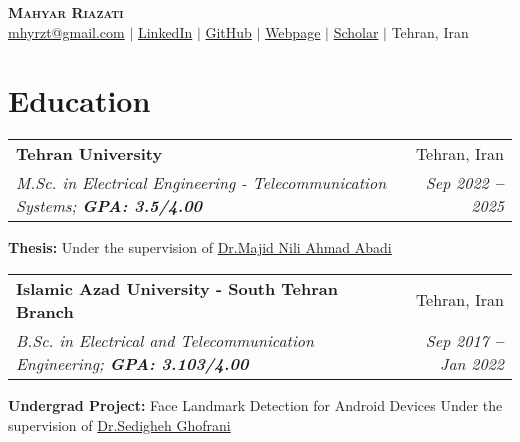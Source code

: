 \documentclass[letterpaper,11pt]{article}
\makeatletter
\newcommand{\resumeEducationHeading}[6]{
  \vspace{-2pt}\item
    \begin{tabular*}{0.97\textwidth}[t]{l@{\extracolsep{\fill}}r}
      \textbf{#1} & #2 \\
      \textit{\small#3} & \textit{\small #4} \\

    \end{tabular*}\vspace{-5pt}
}
\newcommand{\resumeSubHeadingListStart}{\begin{itemize}[leftmargin=0.15in, label={}]}
\newcommand{\resumeSubHeadingListEnd}{\end{itemize}}
\makeatother
\begin{document}
\begin{center}
	\textbf{\Huge \scshape Mahyar Riazati} \\ \vspace{8pt}
	\small
	\faEnvelope \hspace{.5pt} \href{mailto:mhyrzt@gmail.com}{mhyrzt@gmail.com}
	$|$
	\faLinkedinSquare \hspace{.5pt} \href{https://www.linkedin.com/in/mhyrzt}{LinkedIn}
	$|$
	\faGithub \hspace{.5pt} \href{https://github.com/mhyrzt}{GitHub}
	$|$
	\faGlobe \hspace{.5pt} \href{https://mhyrzt.me}{Webpage}
	$|$
	\faGraduationCap \hspace{.5pt} \href{https://scholar.google.com/citations?user=k-nwlcYAAAAJ&hl=en}{Scholar}
	$|$
	\faMapMarker \hspace{.5pt} Tehran, Iran
\end{center}


\section{Education}
\vspace{3pt}
\resumeSubHeadingListStart

\resumeEducationHeading
{Tehran University}{Tehran, Iran}
{M.Sc. in Electrical Engineering - Telecommunication Systems; \textbf{GPA: 3.5/4.00}}{Sep 2022 \textbf{--} 2025}
{} {}
\resumeSubHeadingListStart
\small{\item{\textbf{Thesis:} Under the supervision of \href{https://ece.ut.ac.ir/en/~mnili}{\color{blue}Dr.Majid Nili Ahmad Abadi}}}
\resumeSubHeadingListEnd

\resumeEducationHeading
{Islamic Azad University - South Tehran Branch}{Tehran, Iran}
{B.Sc. in Electrical and Telecommunication Engineering; \textbf{GPA: 3.103/4.00}}{Sep 2017 \textbf{--} Jan 2022}
{} {}
\resumeSubHeadingListStart
\small{\item{\textbf{Undergrad Project:} Face Landmark Detection for Android Devices Under the supervision of  \href{https://www.linkedin.com/in/sedigheh-ghofrani-b6495b63/}{\color{blue}Dr.Sedigheh Ghofrani}}}
\resumeSubHeadingListEnd

\resumeSubHeadingListEnd

\end{document}
